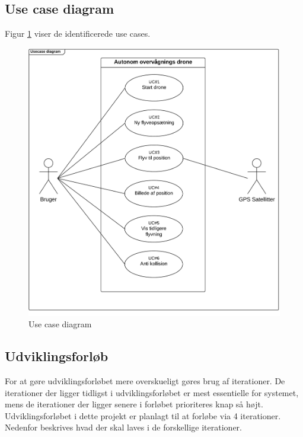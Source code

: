 \newpage 

\subsection{Use case diagram}
\label{subsec:useCaseDiagram}
Figur \ref{fig:UCD} viser de identificerede use cases.
\vspace{-10pt}
\begin{figure}[H]
\includegraphics[width=1\textwidth]{Billeder/Use_case_diagram.png}
\vspace{-0.8cm}
\caption{Use case diagram}
\label{fig:UCD}
\end{figure}




\newpage
\subsection{Udviklingsforløb}

For at gøre udviklingsforløbet mere overskueligt gøres brug af iterationer.
De iterationer der ligger tidligst i udviklingsforløbet er mest essentielle for systemet, 
mens de iterationer der ligger senere i forløbet prioriteres knap så højt.
Udviklingsforløbet i dette projekt er planlagt til at forløbe via 4 iterationer. Nedenfor beskrives hvad der skal laves i de forskellige iterationer. \\

